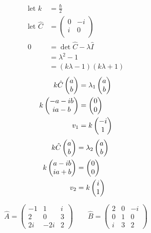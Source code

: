\documentclass[12pt]{article}
\begin{document}
\problemsub %
\begin{align*}
\text{let $k$} &= \frac{\hbar}{2} \\
\text{let $\hat{C}$} &= \left(\begin{matrix}
  0 & -i \\
  i & 0 \\
 \end{matrix}\right) \\
0 &= \det{\hat{C} - \lambda\hat{I}} \\
 &= \lambda^2-1 \\
 &= (k\lambda - 1)(k\lambda + 1)
\end{align*}
\begin{align*}
k\hat{C}\colvec{a}{b} &= \lambda_1\colvec{a}{b} \\
k\colvec{-a-ib}{ia-b} &= \colvec{0}{0} \\
v_1 &= k\colvec{-i}{1}
\end{align*}
\begin{align*}
k\hat{C}\colvec{a}{b} &= \lambda_2\colvec{a}{b} \\
k\colvec{a-ib}{ia+b} &= \colvec{0}{0} \\
v_2 &= k\colvec{i}{1}
\end{align*}

\problem %

$$\hat{A} = \left(\begin{matrix}
-1 & 1 & i \\
2 & 0 & 3 \\
2i & -2i & 2
\end{matrix}\right) \qquad
\hat{B} = \left(\begin{matrix}
2 & 0 & -i \\
0 & 1 & 0 \\
i & 3 & 2
\end{matrix}\right)$$
\end{document}
